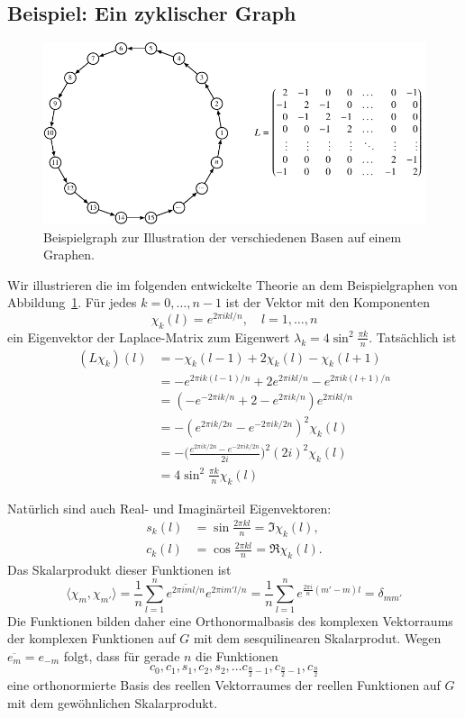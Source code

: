 \subsection{Beispiel: Ein zyklischer Graph
\label{buch:graphen:subsection:zyklischer-graph}}
\begin{figure}
\centering
\includegraphics{chapters/70-graphen/images/kreis.pdf}
\caption{Beispielgraph zur Illustration der verschiedenen Basen auf einem
Graphen.
\label{buch:graphen:fig:kreis}}
\end{figure}
Wir illustrieren die im folgenden entwickelte Theorie an dem Beispielgraphen
von Abbildung~\ref{buch:graphen:fig:kreis}.
Für jedes $k=0,\dots,n-1$ ist der Vektor mit den Komponenten
\[
\chi_k(l) = e^{2\pi ikl/n}, \quad l=1,\dots,n
\]
ein Eigenvektor der Laplace-Matrix zum Eigenwert
$\lambda_k=4\sin^2\frac{\pi k}{n}$.
Tatsächlich ist
\begin{align*}
(L\chi_k)(l)
&=
-\chi_k(l-1)
+
2\chi_k(l)
-
\chi_k(l+1)
\\
&=
-e^{2\pi ik(l-1)/n}
+
2e^{2\pi ikl/n}
-
e^{2\pi ik(l+1)/n}
\\
&=
(-e^{-2\pi ik/n}+2-e^{2\pi ik/n})e^{2\pi ikl/n}
\\
&=
-(e^{2\pi ik/2n}-e^{-2\pi ik/2n})^2 \chi_k(l)
\\
&=
-
\biggl(
\frac{e^{2\pi ik/2n}-e^{-2\pi ik/2n}}{2i}
\biggr)^2
(2i)^2 \chi_k(l)
\\
&=
4\sin^2\frac{\pi k}n \chi_k(l)
\end{align*}

Natürlich sind auch Real- und Imaginärteil Eigenvektoren:
\[
\begin{aligned}
s_k(l)
&=
\sin\frac{2\pi kl}{n}
=
\Im \chi_k(l),
\\
c_k(l)
&=
\cos\frac{2\pi kl}{n}
=
\Re\chi_k(l).
\end{aligned}
\]
Das Skalarprodukt dieser Funktionen ist
\[
\langle \chi_m, \chi_{m'}\rangle
=
\frac1n
\sum_{l=1}^n
\overline{e^{2\pi i ml/n}}
e^{2\pi im'l/n}
=
\frac1n
\sum_{l=1}^n
e^{\frac{2\pi i}{n}(m'-m)l}
=
\delta_{mm'}
\]
Die Funktionen bilden daher eine Orthonormalbasis des komplexen
Vektorraums der
komplexen Funktionen auf $G$ mit dem sesquilinearen Skalarprodut.
Wegen $\overline{e_m} = e_{-m}$ folgt, dass für gerade $n$
die Funktionen
\[
c_0, c_1,s_1,c_2,s_2,\dots c_{\frac{n}2-1},c_{\frac{n}2-1},c_{\frac{n}2}
\]
eine orthonormierte Basis des reellen Vektorraumes der reellen Funktionen
auf $G$ mit dem gewöhnlichen Skalarprodukt.


